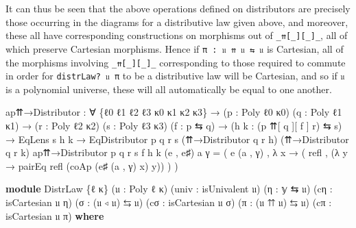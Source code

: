 \documentclass[
  11pt,
  oneside,
  article]{memoir}
\newenvironment{Shaded}{}{}
\newcommand{\KeywordTok}[1]{\textcolor[rgb]{0.00,0.44,0.13}{\textbf{#1}}}
\newcommand{\NormalTok}[1]{#1}
\newcommand{\OtherTok}[1]{\textcolor[rgb]{0.00,0.44,0.13}{#1}}
\theoremstyle{definition}
\theoremstyle{plain}
\newcommand{\0}{\textsf{0}}
\newcommand{\1}{\tn{\textsf{1}}}
\begin{document}
It can thus be seen that the above operations defined on distributors
are precisely those occurring in the diagrams for a distributive law
given above, and moreover, these all have corresponding constructions on
morphisms out of \texttt{\_⇈{[}\_{]}{[}\_{]}\_}, all of which preserve
Cartesian morphisms. Hence if \texttt{π\ :\ 𝔲\ ⇈\ 𝔲\ ⇆\ 𝔲} is Cartesian,
all of the morphisms involving \texttt{\_⇈{[}\_{]}{[}\_{]}\_}
corresponding to those required to commute in order for
\texttt{distrLaw?\ 𝔲\ π} to be a distributive law will be Cartesian, and
so if \texttt{𝔲} is a polynomial universe, these will all automatically
be equal to one another.

\begin{Shaded}
\begin{Highlighting}[]
\NormalTok{ap⇈→Distributor }\OtherTok{:} \OtherTok{∀} \OtherTok{\{}\NormalTok{ℓ0 ℓ1 ℓ2 ℓ3 κ0 κ1 κ2 κ3}\OtherTok{\}}
                  \OtherTok{→} \OtherTok{(}\NormalTok{p }\OtherTok{:}\NormalTok{ Poly ℓ0 κ0}\OtherTok{)} \OtherTok{(}\NormalTok{q }\OtherTok{:}\NormalTok{ Poly ℓ1 κ1}\OtherTok{)}
                  \OtherTok{→} \OtherTok{(}\NormalTok{r }\OtherTok{:}\NormalTok{ Poly ℓ2 κ2}\OtherTok{)} \OtherTok{(}\NormalTok{s }\OtherTok{:}\NormalTok{ Poly ℓ3 κ3}\OtherTok{)} \OtherTok{(}\NormalTok{f }\OtherTok{:}\NormalTok{ p ⇆ q}\OtherTok{)}
                  \OtherTok{→} \OtherTok{(}\NormalTok{h k }\OtherTok{:} \OtherTok{(}\NormalTok{p ⇈[ q ][ f ] r}\OtherTok{)}\NormalTok{ ⇆ s}\OtherTok{)} \OtherTok{→}\NormalTok{ EqLens s h k }
                  \OtherTok{→}\NormalTok{ EqDistributor p q r s }\OtherTok{(}\NormalTok{⇈→Distributor q r h}\OtherTok{)}
                                          \OtherTok{(}\NormalTok{⇈→Distributor q r k}\OtherTok{)}
\NormalTok{ap⇈→Distributor p q r s f h k }\OtherTok{(}\NormalTok{e , e♯}\OtherTok{)}\NormalTok{ a γ }\OtherTok{=} 
    \OtherTok{(}\NormalTok{ e }\OtherTok{(}\NormalTok{a , γ}\OtherTok{)} 
\NormalTok{    , }\OtherTok{λ}\NormalTok{ x }\OtherTok{→} \OtherTok{(}\NormalTok{ refl , }\OtherTok{(λ}\NormalTok{ y }\OtherTok{→}\NormalTok{ pairEq refl }\OtherTok{(}\NormalTok{coAp }\OtherTok{(}\NormalTok{e♯ }\OtherTok{(}\NormalTok{a , γ}\OtherTok{)}\NormalTok{ x}\OtherTok{)}\NormalTok{ y}\OtherTok{))} \OtherTok{)} \OtherTok{)}

\KeywordTok{module}\NormalTok{ DistrLaw }\OtherTok{\{}\NormalTok{ℓ κ}\OtherTok{\}} \OtherTok{(}\NormalTok{𝔲 }\OtherTok{:}\NormalTok{ Poly ℓ κ}\OtherTok{)} \OtherTok{(}\NormalTok{univ }\OtherTok{:}\NormalTok{ isUnivalent 𝔲}\OtherTok{)}
                \OtherTok{(}\NormalTok{η }\OtherTok{:}\NormalTok{ 𝕪 ⇆ 𝔲}\OtherTok{)} \OtherTok{(}\NormalTok{cη }\OtherTok{:}\NormalTok{ isCartesian 𝔲 η}\OtherTok{)}
                \OtherTok{(}\NormalTok{σ }\OtherTok{:} \OtherTok{(}\NormalTok{𝔲 ◃ 𝔲}\OtherTok{)}\NormalTok{ ⇆ 𝔲}\OtherTok{)} \OtherTok{(}\NormalTok{cσ }\OtherTok{:}\NormalTok{ isCartesian 𝔲 σ}\OtherTok{)}
                \OtherTok{(}\NormalTok{π }\OtherTok{:} \OtherTok{(}\NormalTok{𝔲 ⇈ 𝔲}\OtherTok{)}\NormalTok{ ⇆ 𝔲}\OtherTok{)} \OtherTok{(}\NormalTok{cπ }\OtherTok{:}\NormalTok{ isCartesian 𝔲 π}\OtherTok{)} \KeywordTok{where}
    

\end{Highlighting}
\end{Shaded}
\end{document}
